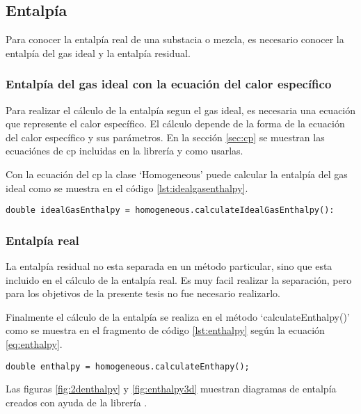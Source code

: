 \subsection{Entalpía}\label{subsec:enthalpy}

	Para conocer la entalpía real de una substacia o mezcla, es necesario conocer la entalpía del gas ideal y la entalpía residual.

\subsubsection{Entalpía del gas ideal con la ecuación del calor específico}
	Para realizar el cálculo de la entalpía segun el gas ideal, es necesaria una ecuación que represente el calor específico. El cálculo depende de la forma de la ecuación del calor específico y sus parámetros. En la sección \ref{sec:cp} se muestran las ecuaciónes de cp incluidas en la librería y como usarlas.

	Con la ecuación del cp la clase `Homogeneous' puede calcular la entalpía del gas ideal como se muestra en el código \ref{lst:idealgasenthalpy}.

	\begin{lstlisting}[label={lst:idealgasenthalpy},caption={Cálculo de la entalpía del gas ideal.}]
	double idealGasEnthalpy = homogeneous.calculateIdealGasEnthalpy():
	\end{lstlisting}
	
\subsubsection{Entalpía real}

	La entalpía residual no esta separada en un método particular, sino que esta incluido en el cálculo de la entalpía real. Es muy facil realizar la separación, pero para los objetivos de la presente tesis no fue necesario realizarlo.

	Finalmente el cálculo de la entalpía se realiza en el método `calculateEnthalpy()' como se muestra en el fragmento de código \ref{lst:enthalpy} según la ecuación \ref{eq:enthalpy}. 

\begin{lstlisting}[caption={Cálculo de la entalpía real},label={lst:enthalpy}]
	double enthalpy = homogeneous.calculateEnthapy();
\end{lstlisting}
	
	Las figuras \ref{fig:2denthalpy} y \ref{fig:enthalpy3d} muestran diagramas de entalpía creados con ayuda de la librería \Materia.

